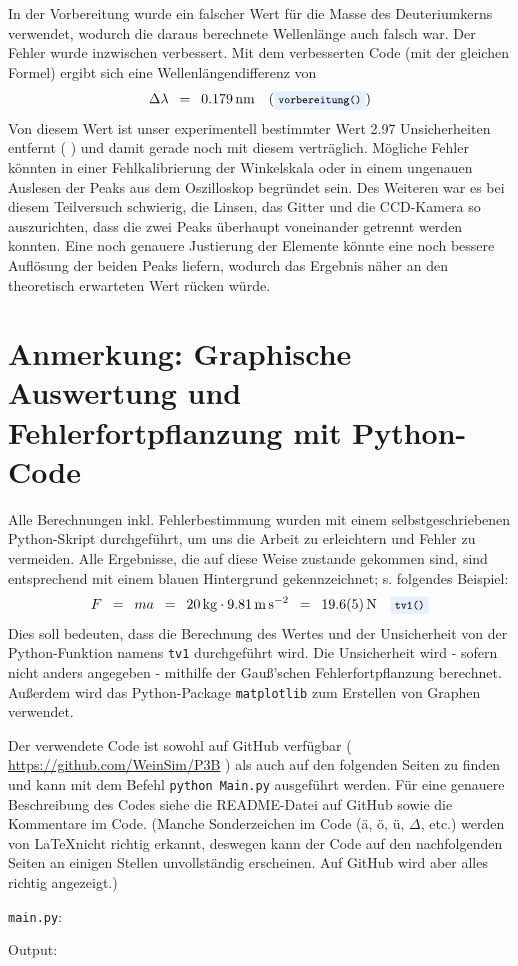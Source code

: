 \documentclass{article}
\newcommand{\widespace}{\enspace}
\newcommand{\wideeq}{\widespace = \widespace}
\newcommand{\coderef}[1]{%
    \text{\footnotesize \colorbox{codebg}{\texttt{#1()}}}%
}
\newcommand{\githuburl}{
    \url{https://github.com/WeinSim/P3B}
}
\begin{document}
In der Vorbereitung wurde ein falscher Wert für die Masse des Deuteriumkerns
verwendet, wodurch die daraus berechnete Wellenlänge auch falsch war.
Der Fehler wurde inzwischen verbessert.
Mit dem verbesserten Code (mit der gleichen Formel) ergibt sich eine
Wellenlängendifferenz von
\[
    \Delta \lambda \wideeq \qty{0.179}{\nm} \quad (\coderef{vorbereitung})
\]
Von diesem Wert ist unser experimentell bestimmter Wert \num{2.97}
Unsicherheiten entfernt (\coderef{tv2}) und damit gerade noch mit diesem
verträglich. Mögliche Fehler könnten in einer Fehlkalibrierung der Winkelskala
oder in einem ungenauen Auslesen der Peaks aus dem Oszilloskop begründet sein.
Des Weiteren war es bei diesem Teilversuch schwierig, die Linsen, das Gitter
und die CCD-Kamera so auszurichten, dass die zwei Peaks überhaupt voneinander
getrennt werden konnten. Eine noch genauere Justierung der Elemente
könnte eine noch bessere Auflösung der beiden Peaks liefern, wodurch
das Ergebnis näher an den theoretisch erwarteten Wert rücken würde.

\newpage

\section{Anmerkung: Graphische Auswertung und Fehlerfortpflanzung mit Python-Code}

Alle Berechnungen inkl. Fehlerbestimmung wurden mit einem selbstgeschriebenen
Python-Skript durchgeführt, um uns die Arbeit zu erleichtern und Fehler zu
vermeiden. Alle Ergebnisse, die auf diese Weise zustande gekommen sind,
sind entsprechend mit einem \colorbox{codebg}{blauen Hintergrund} gekennzeichnet;
s. folgendes Beispiel:
\[
    F \wideeq ma \wideeq \qty{20}{\kg} \cdot \qty{9.81}{\meter\per\square\second}
    \wideeq \qty{19.6 \pm 0.5}{\newton} \quad \coderef{tv1}
\]
Dies soll bedeuten, dass die Berechnung des Wertes und der Unsicherheit von der
Python-Funktion namens \verb|tv1| durchgeführt wird.
Die Unsicherheit wird - sofern nicht anders angegeben - mithilfe der Gauß'schen
Fehlerfortpflanzung berechnet.
Außerdem wird das Python-Package \texttt{matplotlib} zum Erstellen
von Graphen verwendet.

Der verwendete Code ist sowohl auf GitHub verfügbar (\githuburl) als auch auf den
folgenden Seiten zu finden und kann mit dem Befehl \texttt{python Main.py}
ausgeführt werden. Für eine genauere Beschreibung des Codes siehe die README-Datei
auf GitHub sowie die Kommentare im Code.
(Manche Sonderzeichen im Code (ä, ö, ü, $\Delta$, etc.) werden von \LaTeX nicht
richtig erkannt, deswegen kann der Code auf den nachfolgenden Seiten an einigen
Stellen unvollständig erscheinen. Auf GitHub wird aber alles richtig angezeigt.)

\newpage


\verb|main.py|:

\newpage

% 

Output:

\end{document}
